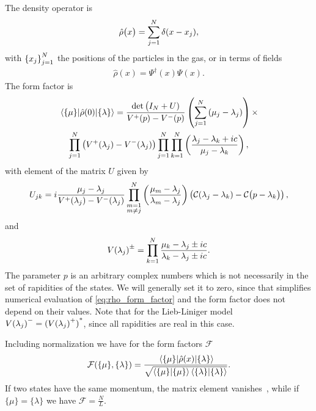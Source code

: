 \documentclass[11pt, a4paper]{report} %
\begin{document}
The density operator is~\cite{Nardis2015}
\begin{align}
  \hat{\rho}\qty\big(x) = \sum_{j=1}^N \delta\qty(x-x_j),
\end{align}
with \({\qty{x_j}}_{j=1}^N\) the positions of the particles in the gas, or in terms of fields~\cite{slavnov90_noneq_time_curren_correl_funct}
\begin{align}
  \label{eq:44}
  \hat{\rho}(x) = \Psi^{\dag}(x)\Psi(x).
\end{align}
The form factor is~\cite{slavnov90_noneq_time_curren_correl_funct, Nardis2015}
\begin{multline}
  \label{eq:rho_form_factor}
  \matrixel{\{\mu\}}{\hat{\rho}(0)}{\{\lambda\}} = \frac{\det\big(I_N +U)}{V^+(p) - V^-(p)}
  \left(\sum_{j=1}^N\qty(\mu_j-\lambda_j)\right) \times\\ \prod_{j=1}^N\left(V^+\qty(\lambda_j) - V^-\qty(\lambda_j)\right)\prod_{j=1}^N\prod_{k=1}^N\left(\frac{\lambda_j-\lambda_k+ic}{\mu_j-\lambda_k}\right),
\end{multline}
with element of the matrix \(U\) given by
\begin{align}
  U_{jk} = i \frac{\mu_j-\lambda_j}{V^+\qty(\lambda_j) -V^-\qty(\lambda_j)}\prod_{\substack{m=1\\m\neq j}}^N \left(\frac{\mu_m - \lambda_j}{\lambda_m-\lambda_j}\right) \left(\mathcal{C}\qty(\lambda_j- \lambda_k) - \mathcal{C}\qty\big(p- \lambda_k)\right),
\end{align}
and 
\begin{align}
  \label{eq:56}
  V{\qty(\lambda_j)}^{\pm} = \prod_{k=1}^N \frac{\mu_k-\lambda_j\pm ic}{\lambda_k-\lambda_j\pm ic}.
\end{align}
The parameter \(p\) is an arbitrary complex numbers which is not necessarily in the set of rapidities of the states.
We will generally set it to zero, since that simplifies numerical evaluation of \cref{eq:rho_form_factor} and the form factor does not depend on their values.
Note that for the Lieb-Liniger model \(V{\qty(\lambda_j)}^{-} = {(V{\qty(\lambda_j)}^{+})}^{*}\), since all rapidities are real in this case.

Including normalization we have for the form factors \(\mathcal{F}\)~\cite{Nardis2015}
\begin{align}
  \label{eq:21}
  \mathcal{F}(\{\mu\}, \{\lambda\}) = \frac{\matrixel{\{\mu\}}{\hat{\rho}(x)}{\{\lambda\}}}{\sqrt{\innerproduct{\{\mu\}}{\{\mu\}}\innerproduct{\{\lambda\}}{\{\lambda\}}}}.
\end{align}
If two states have the same momentum, the matrix element vanishes~\cite{slavnov90_noneq_time_curren_correl_funct}, while if $\{\mu\} = \{\lambda\}$ we have $\mathcal{F}=\frac{N}{L}$.
\end{document}
